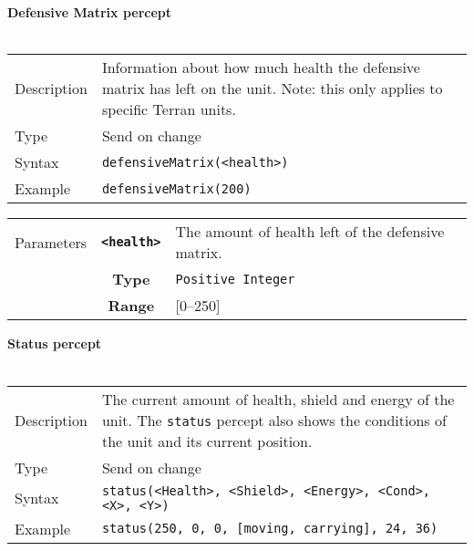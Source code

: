 \\
\\
\noindent
\textbf{Defensive Matrix percept}\\
\\
\begin{tabularx}{\textwidth}{lX}
 Description & Information about how much health the defensive matrix has left on the unit. Note: this only applies to specific Terran units. \\
 Type & Send on change \\
 Syntax & \verb|defensiveMatrix(<health>)| \\
 Example & \verb|defensiveMatrix(200)|   \\
 \end{tabularx}
 \begin{tabularx}{\textwidth}{l | c | p{8cm}|}
 \cline{2-3}
 Parameters & \textbf{\verb|<health>|} & The amount of health left of the defensive matrix.\\
            & \textbf{Type} & \verb|Positive Integer| \\
            & \textbf{Range} & [0--250] \\
            \cline{2-3}
\end{tabularx}
\newpage
\noindent
\textbf{Status percept}\\
\\
\begin{tabularx}{\textwidth}{lX}
 Description & The current amount of health, shield and energy of the unit. The \verb|status| percept also shows the conditions of the unit and its current position. \\
 Type & Send on change \\
 Syntax & \verb|status(<Health>, <Shield>, <Energy>, <Cond>, <X>, <Y>)| \\
 Example & \verb|status(250, 0, 0, [moving, carrying], 24, 36)|   \\
 \end{tabularx}\\
